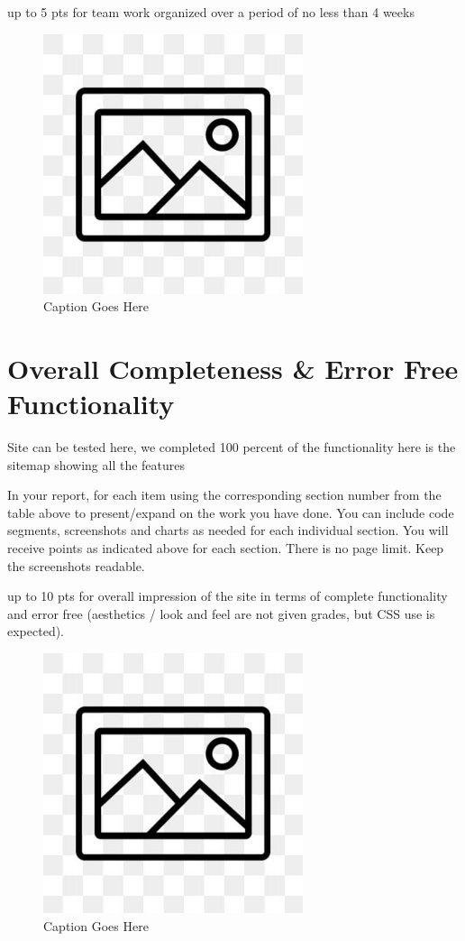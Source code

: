 \documentclass[12pt, letterpaper]{article}
\begin{document}
up to 5 pts for team work organized over a period of no less than 4 weeks

\begin{figure}[htbp]
	\centering
	\includegraphics[width=3in]{images/placeholder.jpg}
	\caption{Caption Goes Here}
 \end{figure}

 \newpage

\section{Overall Completeness \& Error Free Functionality}
Site can be tested here, we completed 100 percent of the functionality here is the sitemap showing all the features

In your report, for each item using the corresponding section number from the table above to present/expand on the work you have done. You can include code segments, screenshots and charts as needed for each individual section. You will receive points as indicated above for each section. There is no page limit. Keep the screenshots readable.

up to 10 pts for overall impression of the site in terms of complete functionality and error free (aesthetics / look and feel are not given grades, but CSS use is expected).

\begin{figure}[htbp]
	\centering
	\includegraphics[width=3in]{images/placeholder.jpg}
	\caption{Caption Goes Here}
 \end{figure}
\end{document}
